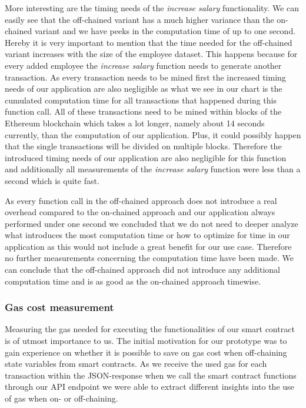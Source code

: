 More interesting are the timing needs of the \textit{increase salary} functionality. We can easily see that the off-chained variant has a much higher variance than the on-chained variant and we have peeks in the computation time of up to one second. Hereby it is very important to mention that the time needed for the off-chained variant increases with the size of the employee dataset. This happens because for every added employee the \textit{increase salary} function needs to generate another transaction. As every transaction needs to be mined first the increased timing needs of our application are also negligible as what we see in our chart is the cumulated computation time for all transactions that happened during this function call. All of these transactions need to be mined within blocks of the Ethereum blockchain which takes a lot longer, namely about 14 seconds currently, than the computation of our application. Plus, it could possibly happen that the single transactions will be divided on multiple blocks. Therefore the introduced timing needs of our application are also negligible for this function and additionally all measurements of the \textit{increase salary} function were less than a second which is quite fast.%

As every function call in the off-chained approach does not introduce a real overhead compared to the on-chained approach and our application always performed under one second we concluded that we do not need to deeper analyze what introduces the most computation time or how to optimize for time in our application as this would not include a great benefit for our use case. Therefore no further measurements concerning the computation time have been made. We can conclude that the off-chained approach did not introduce any additional computation time and is as good as the on-chained approach timewise.

\subsubsection{Gas cost measurement}
Measuring the gas needed for executing the functionalities of our smart contract is of utmost importance to us. The initial motivation for our prototype was to gain experience on whether it is possible to save on gas cost when off-chaining state variables from smart contracts. As we receive the used gas for each transaction within the JSON-response when we call the smart contract functions through our API endpoint we were able to extract different insights into the use of gas when on- or off-chaining.

